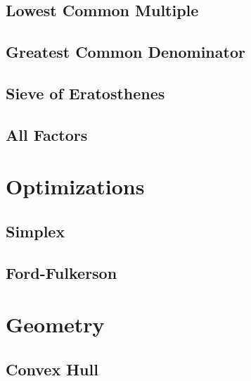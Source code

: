 \documentclass[10pt,a4paper]{article}
\begin{document}
\begin{landscape}
\begin{multicols*}{2}


\subsection{Lowest Common Multiple}



\subsection{Greatest Common Denominator}



\subsection{Sieve of Eratosthenes}



\subsection{All Factors}



\section{Optimizations}

\subsection{Simplex}



\subsection{Ford-Fulkerson}



\section{Geometry}

\subsection{Convex Hull}


\end{multicols*}
\end{landscape}
\end{document}
